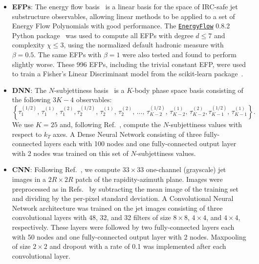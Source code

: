 \documentclass[letterpaper,11pt]{article}
\DeclareRobustCommand{\Ref}[1]{Ref.~\cite{#1}}
\DeclareRobustCommand{\Refs}[1]{Refs.~\cite{#1}}
\begin{document}
\begin{itemize}
\item \textbf{EFPs}: The energy flow basis~\cite{Komiske:2017aww} is a linear basis for the space of IRC-safe jet substructure observables, allowing linear methods to be applied to a set of Energy Flow Polynomials with good performance.
%
The \href{https://energyflow.network}{\texttt{EnergyFlow}} 0.8.2 Python package~\cite{energyflow} was used to compute all EFPs with degree $d\le7$ and complexity $\chi\le3$, using the normalized default hadronic measure with $\beta=0.5$.
%
The same EFPs with $\beta=1$ were also tested and found to perform slightly worse.
%
These 996 EFPs, including the trivial constant EFP, were used to train a Fisher's Linear Discriminant model from the scikit-learn package~\cite{scikit-learn}.


\item \textbf{DNN}: The $N$-subjettiness basis~\cite{Datta:2017rhs} is a $K$-body phase space basis consisting of the following $3K-4$ observables:
\begin{equation}
\label{eq:nsubbasis}
\left\{\tau_1^{(1/2)},\,\tau_1^{(1)},\,\tau_1^{(2)},\tau_2^{(1/2)},\,\tau_2^{(1)},\,\tau_2^{(2)},\,\ldots,\,\tau_{K-2}^{(1/2)},\,\tau_{K-2}^{(1)},\,\tau_{K-2}^{(2)},\tau_{K-1}^{(1/2)},\,\tau_{K-1}^{(1)}\right\}.
\end{equation}
%
We use $K=25$ and, following \Ref{Datta:2017rhs}, compute the $N$-subjettiness values with respect to $k_T$ axes.
%
A Dense Neural Network consisting of three fully-connected layers each with 100 nodes and one fully-connected output layer with 2 nodes was trained on this set of $N$-subjettiness values.


\item \textbf{CNN}: Following \Ref{Komiske:2016rsd}, we compute $33\times33$ one-channel (grayscale) jet images in a $2R\times2R$ patch of the rapidity-azimuth plane.
%
Images were preprocessed as in \Refs{Komiske:2016rsd,Komiske:2018vkc} by subtracting the mean image of the training set and dividing by the per-pixel standard deviation.
%
A Convolutional Neural Network architecture was trained on the jet images consisting of three convolutional layers with 48, 32, and 32 filters of size $8\times8$, $4\times4$, and $4\times4$, respectively. 
%
These layers were followed by two fully-connected layers each with 50 nodes and one fully-connected output layer with 2 nodes.
%
Maxpooling of size $2\times2$ and dropout with a rate of 0.1 was implemented after each convolutional layer.

\end{itemize}
\end{document}
